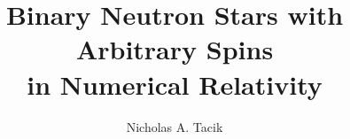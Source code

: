 

 
 \author{Nicholas A. Tacik} \title{Binary Neutron Stars with Arbitrary Spins\\ in Numerical Relativity}



%
\setcounter{tocdepth}{2}








\newcommand{\red}[1]{\textcolor{Red}{#1}}
\newcommand{\harald}[1]{\textcolor{OliveGreen}{#1}}
\newcommand{\nick}[1]{\textcolor{blue}{\textit{Nick: #1}}}
\newcommand{\munu}[0]{\mu\nu}
\newcommand{\ttt}[0]{\rm{TT}}


